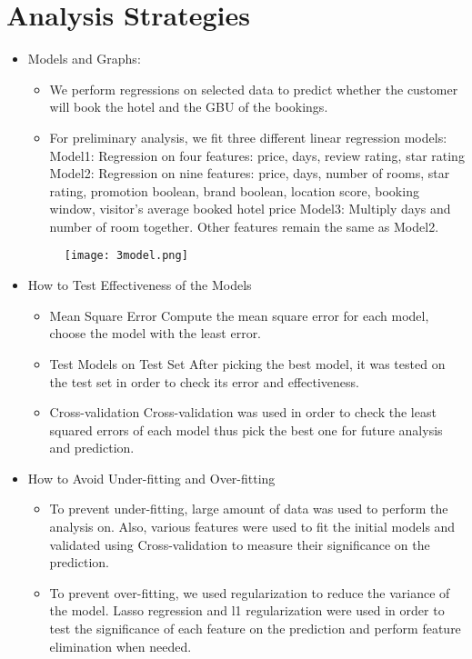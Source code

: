 \documentclass{article}
\begin{document}
\section{Analysis Strategies}
\begin{itemize}
    \item Models and Graphs:
    \begin{itemize}
        \item We perform regressions on selected data to predict whether the customer will book the hotel and the GBU of the bookings.
        \item For preliminary analysis, we fit three different linear regression models: \newline
        Model1: Regression on four features: price, days, review rating, star rating\newline
        Model2: Regression on nine features: price, days, number of rooms, star rating, promotion boolean, brand boolean, location score, booking window, visitor's average booked hotel price\newline
        Model3: Multiply days and number of room together. Other features remain the same as Model2.
        
    \end{itemize}
    \begin{figure}[ht]
        \centering
        \texttt{[image: 3model.png]}
    \end{figure}
    \item How to Test Effectiveness of the Models
    \begin{itemize}
        \item Mean Square Error\newline
        Compute the mean square error for each model, choose the model with the least error.
        \item Test Models on Test Set \newline
        After picking the best model, it was tested on the test set in order to check its error and effectiveness.
        \item Cross-validation \newline
        Cross-validation was used in order to check the least squared errors of each model thus pick the best one for future analysis and prediction.
        
    \end{itemize}
    \item How to Avoid Under-fitting and Over-fitting
    \begin{itemize}
        \item To prevent under-fitting, large amount of data was used to perform the analysis on. Also, various features were used to fit the initial models and validated using Cross-validation to measure their significance on the prediction.
        \item To prevent over-fitting, we used regularization to reduce the variance of the model. Lasso regression and l1 regularization were used in order to test the significance of each feature on the prediction and perform feature elimination when needed.
    \end{itemize}
\end{itemize}
\end{document}
